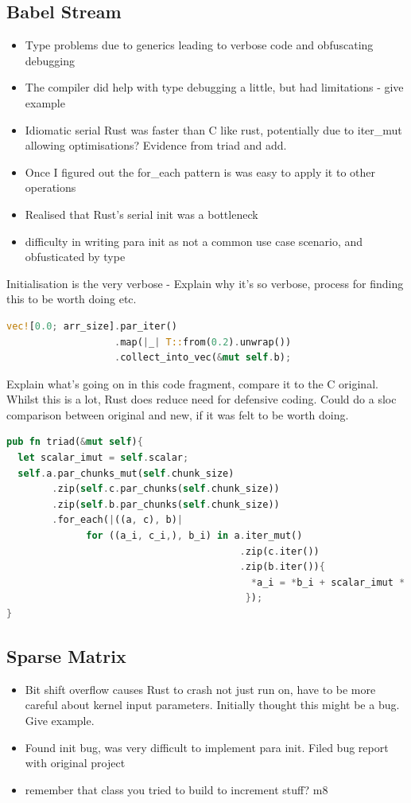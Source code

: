 \subsection{Babel Stream}
\begin{itemize}
  \item Type problems due to generics leading to verbose code and obfuscating debugging
  \item The compiler did help with type debugging a little, but had limitations - give example
  \item Idiomatic serial Rust was faster than C like rust, potentially due to iter\_mut allowing optimisations? Evidence from triad and add.
  \item Once I figured out the for\_each pattern is was easy to apply it to other operations
  \item Realised that Rust's serial init was a bottleneck
  \item difficulty in writing para init as not a common use case scenario, and obfusticated by type
\end{itemize}

Initialisation is the very verbose - Explain why it's so verbose, process for finding this to be worth doing etc.
\begin{lstlisting}[language=Rust]
vec![0.0; arr_size].par_iter()
                   .map(|_| T::from(0.2).unwrap())
                   .collect_into_vec(&mut self.b);
\end{lstlisting}

Explain what's going on in this code fragment, compare it to the C original. Whilst this is a lot, Rust does reduce need for defensive coding. Could do a sloc comparison between original and new, if it was felt to be worth doing.

\begin{lstlisting}[language=Rust]
pub fn triad(&mut self){
  let scalar_imut = self.scalar;
  self.a.par_chunks_mut(self.chunk_size)
        .zip(self.c.par_chunks(self.chunk_size))
        .zip(self.b.par_chunks(self.chunk_size))
        .for_each(|((a, c), b)|
              for ((a_i, c_i,), b_i) in a.iter_mut()
                                         .zip(c.iter())
                                         .zip(b.iter()){
                                           *a_i = *b_i + scalar_imut * *c_i
                                          });
}
\end{lstlisting}

\subsection{Sparse Matrix}
\begin{itemize}
  \item Bit shift overflow causes Rust to crash not just run on, have to be more careful about kernel input parameters. Initially thought this might be a bug. Give example.
  \item Found init bug, was very difficult to implement para init. Filed bug report with original project
  \item remember that class you tried to build to increment stuff? m8
\end{itemize}

